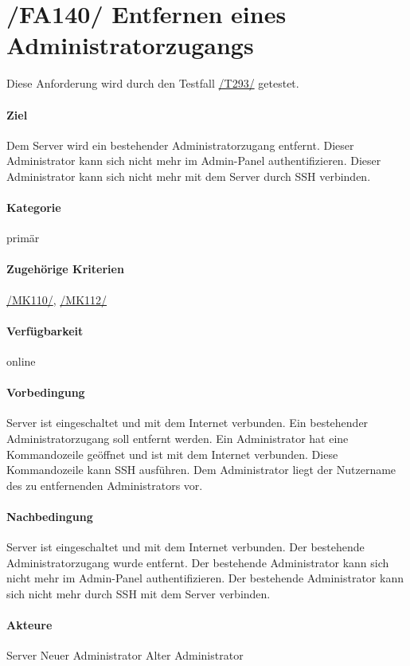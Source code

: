 \section[Entfernen eines Administratorzugangs]{/FA140/ Entfernen eines Administratorzugangs}
\label{/FA140/}
Diese Anforderung wird durch den Testfall \hyperref[/T293/]{/T293/} getestet.
\paragraph{Ziel}
Dem \Gls{Server} wird ein bestehender \Gls{Administrator}zugang entfernt.
Dieser Administrator kann sich nicht mehr im \Gls{Admin-Panel} authentifizieren.
Dieser Administrator kann sich nicht mehr mit dem \Gls{Server} durch \Gls{SSH} verbinden.
\paragraph{Kategorie}
primär
\paragraph{Zugehörige Kriterien}
\hyperref[/MK110/]{/MK110/}, \hyperref[/MK112/]{/MK112/}
\paragraph{Verfügbarkeit}
online
\paragraph{Vorbedingung}
\Gls{Server} ist eingeschaltet und mit dem Internet verbunden.
Ein bestehender \Gls{Administrator}zugang soll entfernt werden.
Ein \Gls{Administrator} hat eine \Gls{Kommandozeile} geöffnet und ist mit dem Internet verbunden.
Diese \Gls{Kommandozeile} kann \Gls{SSH} ausführen.
Dem \Gls{Administrator} liegt der Nutzername des zu entfernenden \Gls{Administrator}s vor.
\paragraph{Nachbedingung}
\Gls{Server} ist eingeschaltet und mit dem Internet verbunden.
Der bestehende \Gls{Administrator}zugang wurde entfernt.
Der bestehende \Gls{Administrator} kann sich nicht mehr im \Gls{Admin-Panel} authentifizieren.
Der bestehende \Gls{Administrator} kann sich nicht mehr durch \Gls{SSH} mit dem Server verbinden.
\paragraph{Akteure}
\Gls{Server}
Neuer \Gls{Administrator}
Alter \Gls{Administrator}
